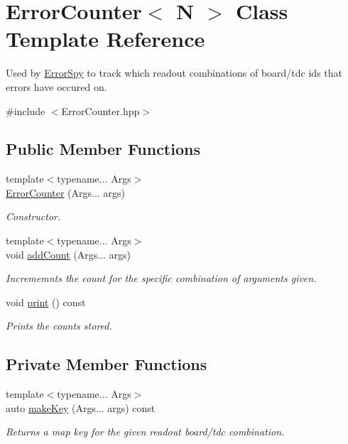 \hypertarget{class_error_counter}{}\section{Error\+Counter$<$ N $>$ Class Template Reference}
\label{class_error_counter}


Used by \hyperlink{class_error_spy}{Error\+Spy} to track which readout combinations of board/tdc ids that errors have occured on.  




{\ttfamily \#include $<$Error\+Counter.\+hpp$>$}

\subsection*{Public Member Functions}
\begin{DoxyCompactItemize}
\item 
{\footnotesize template$<$typename... Args$>$ }\\\hyperlink{class_error_counter_a25c2e6afc0732afae9dcdbd1a6a7d84f}{Error\+Counter} (Args... args)
\begin{DoxyCompactList}\small\item\em Constructor. \end{DoxyCompactList}\item 
{\footnotesize template$<$typename... Args$>$ }\\void \hyperlink{class_error_counter_a6d2fdf410a8860c744f0f9806ec8ce1d}{add\+Count} (Args... args)
\begin{DoxyCompactList}\small\item\em Incrememnts the count for the specific combination of arguments given. \end{DoxyCompactList}\item 
void \hyperlink{class_error_counter_abdfe6078e6536b0af4860e84d0cb113c}{print} () const
\begin{DoxyCompactList}\small\item\em Prints the counts stored. \end{DoxyCompactList}\end{DoxyCompactItemize}
\subsection*{Private Member Functions}
\begin{DoxyCompactItemize}
\item 
{\footnotesize template$<$typename... Args$>$ }\\auto \hyperlink{class_error_counter_ace87ff9ca25693815b683f7e28349e95}{make\+Key} (Args... args) const
\begin{DoxyCompactList}\small\item\em Returns a map key for the given readout board/tdc combination. \end{DoxyCompactList}\end{DoxyCompactItemize}
